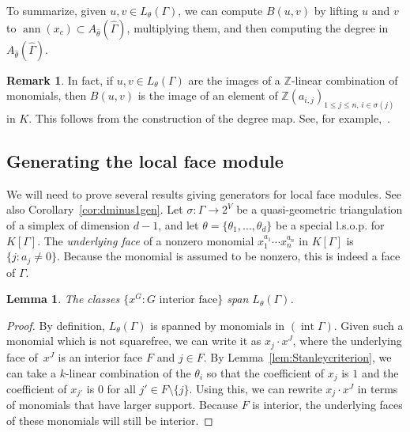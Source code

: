 \documentclass[11pt]{article}
\newtheorem{lemm}[theo]{Lemma}
\theoremstyle{definition}
\newtheorem{rema}[theo]{Remark}
\numberwithin{equation}{section}
\def\Z{\mathbb{Z}}
\numberwithin{equation}{section}
\begin{document}
To summarize, given $u, v \in L_{\theta}(\Gamma)$, we can compute $B(u, v)$ by lifting $u$ and $v$ to $\operatorname{ann}(x_c) \subset A_{\hat{\theta}}(\hat{\Gamma})$, multiplying them, and then computing the degree in $A_{\hat{\theta}}(\hat{\Gamma})$. 

\begin{rema}\label{rem:Bindependentfield}
	 In fact, if $u, v \in L_{\theta}(\Gamma)$ are the images of a $\Z$-linear combination of monomials, then $B(u,v)$ is the image of an element of $\Z(a_{i,j})_{1 \le j \le n, \, i \in \sigma(j)}$ in $K$. 	This follows from the construction of the degree map. See, for example,~\cite[(1),(4)]{LNS}. 
\end{rema}

\subsection{Generating the local face module}

We will need to prove several results giving generators for local face modules. See also Corollary~\ref{cor:dminus1gen}. Let $\sigma \colon \Gamma \to 2^V$ be a quasi-geometric triangulation of a simplex of dimension $d-1$, and let $\theta = \{ \theta_1, \dotsc, \theta_d \}$ be a special l.s.o.p. for $K[\Gamma]$.
The \emph{underlying face} of a nonzero monomial $x_1^{a_1} \dotsb x_n^{a_n}$ in $K[\Gamma]$ is $\{j : a_j \not= 0\}$. Because the monomial is assumed to be nonzero, this is indeed a face of $\Gamma$. 

\begin{lemm}\label{lem:squarefree}
	The classes $\{x^G : G \text{ interior face}\}$ span $L_\theta(\Gamma)$. 
\end{lemm}

\begin{proof}
	By definition, $L_\theta(\Gamma)$ is spanned by monomials in $(\operatorname{int} \Gamma)$. Given such a monomial which is not squarefree, we can write it as $x_j \cdot x^J$, where the underlying face of~$x^J$ is an interior face $F$ and $j \in F$. 
	By Lemma~\ref{lem:Stanleycriterion}, 
	we can take a $k$-linear combination of the $\theta_i$ so that the coefficient of $x_j$ is $1$ and the coefficient of $x_{j'}$ is $0$ for all $j' \in F \setminus \{j\}$. Using this, we can rewrite $x_j \cdot x^J$ in terms of monomials that have larger support. Because $F$ is interior, the underlying faces of these monomials will still be interior. 
\end{proof}
\end{document}
